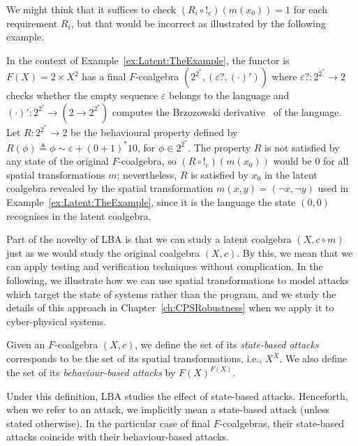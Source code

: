 We might think that it suffices to check $(R_i\circ !_c)(m(x_0))=1$ for each requirement $R_i$, but that would be incorrect as illustrated by the following example.
\begin{example}
    In the context of Example~\ref{ex:Latent:TheExample}, the functor is $F(X)=2\times X^2$ has a final $F$-coalgebra $(2^{2^*},(\varepsilon?,(\cdot)'))$ where $\varepsilon? \colon 2^{2^*}\rightarrow 2$ checks whether the empty sequence $\varepsilon$ belongs to the language and $(\cdot)'\colon 2^{2^*}\rightarrow (2\rightarrow {2^{2^*}})$ computes the Brzozowski derivative~\cite{BrzozowskiDerivative} of the language.  
    Let $R\colon 2^{2^*}\rightarrow 2$ be the behavioural property defined by $R(\phi)\triangleq \phi \sim \varepsilon+(0+1)^*10$, for $\phi \in 2^{2^*}$. The property $R$ is not satisfied by any state of the original $F$-coalgebra, so $(R\circ !_c)(m(x_0))$ would be 0 for all spatial transformations $m$; nevertheless, $R$ is satisfied by $x_0$ in the latent coalgebra revealed by the spatial transformation $m(x,y)=(\lnot x, \lnot y)$ used in Example~\ref{ex:Latent:TheExample}, since it is the language the state $(0,0)$ recognises in the latent coalgebra. 
\end{example}
Part of the novelty of LBA is that we can study a latent coalgebra $(X, c\circ m)$ just as we would study the original coalgebra $(X, c)$. By this, we mean that we can apply testing and verification techniques without complication. In the following, we illustrate how we can use spatial transformations to model attacks which target the state of systems rather than the program, and we study the details of this approach in Chapter~\ref{ch:CPSRobustness} when we apply it to cyber-physical systems.
\begin{definition}
    \label{def:Latent:StateAttacks}
    Given an $F$-coalgebra $(X,c)$, we define the set of its \emph{state-based attacks} corresponds to be the set of its spatial transformations, i.e., $X^X$. 
    We also define the set of its \emph{behaviour-based attacks} by $F(X)^{F(X)}$. 
    \end{definition}
Under this definition, LBA studies the effect of state-based attacks. Henceforth, when we refer to an attack, we implicitly mean a state-based attack (unless stated otherwise). In the particular case of final $F$-coalgebras, their state-based attacks coincide with their behaviour-based attacks. 

